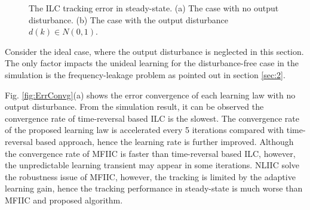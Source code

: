 \documentclass[a4paper, 12pt, twoside, openright]{mythesis}
\begin{document}
\begin{figure}[t]
 	\begin{center}
 	\caption{The ILC tracking error in steady-state. (a) The case with no output disturbance. (b) The case with the output disturbance $d(k)\in \mathit{N}(0,1)$. }
 	\label{fig:TrkingErr}
 	\end{center}
\end{figure}

 Consider the ideal case, where the output disturbance is neglected in this section. The only factor impacts the unideal learning for the disturbance-free case in the simulation is the frequency-leakage problem as pointed out in section \ref{sec:2}. 

Fig. \ref{fig:ErrConvg}(a) shows the error convergence of each learning law with no output disturbance. From the simulation result, it can be observed the convergence rate of time-reversal based ILC is the slowest. The convergence rate of the proposed learning law is accelerated every 5 iterations compared with time-reversal based approach, hence the learning rate is further improved. Although the convergence rate of MFIIC is faster than time-reversal based ILC, however, the unpredictable learning transient may appear in some iterations. NLIIC solve the robustness issue of MFIIC, however, the tracking is limited by the adaptive learning gain, hence the tracking performance in steady-state is much worse than MFIIC and proposed algorithm. 
\end{document}
